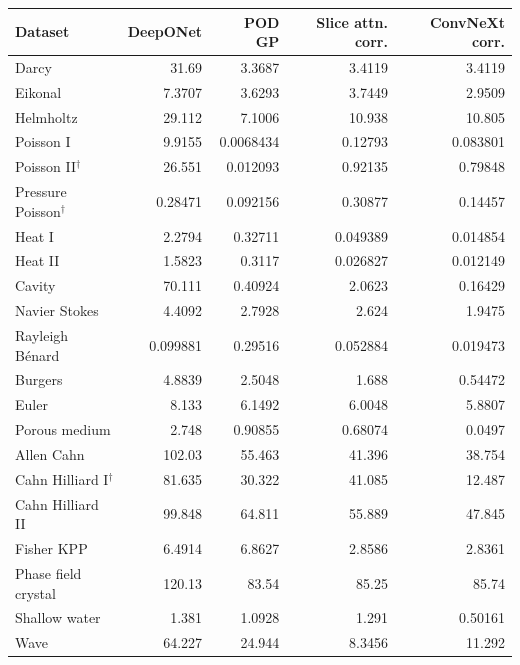 \begin{tabular}{lrrrr}
\toprule
Dataset & DeepONet & POD GP & Slice attn. corr. & ConvNeXt corr. \\
\midrule
Darcy & 31.69 & 3.3687 & 3.4119 & 3.4119 \\
Eikonal & 7.3707 & 3.6293 & 3.7449 & 2.9509 \\
Helmholtz & 29.112 & 7.1006 & 10.938 & 10.805 \\
Poisson I & 9.9155 & 0.0068434 & 0.12793 & 0.083801 \\
Poisson II$^{\dagger}$ & 26.551 & 0.012093 & 0.92135 & 0.79848 \\
Pressure Poisson$^{\dagger}$ & 0.28471 & 0.092156 & 0.30877 & 0.14457 \\
Heat I & 2.2794 & 0.32711 & 0.049389 & 0.014854 \\
Heat II & 1.5823 & 0.3117 & 0.026827 & 0.012149 \\
Cavity & 70.111 & 0.40924 & 2.0623 & 0.16429 \\
Navier Stokes & 4.4092 & 2.7928 & 2.624 & 1.9475 \\
Rayleigh Bénard & 0.099881 & 0.29516 & 0.052884 & 0.019473 \\
Burgers & 4.8839 & 2.5048 & 1.688 & 0.54472 \\
Euler & 8.133 & 6.1492 & 6.0048 & 5.8807 \\
Porous medium & 2.748 & 0.90855 & 0.68074 & 0.0497 \\
Allen Cahn & 102.03 & 55.463 & 41.396 & 38.754 \\
Cahn Hilliard I$^{\dagger}$ & 81.635 & 30.322 & 41.085 & 12.487 \\
Cahn Hilliard II & 99.848 & 64.811 & 55.889 & 47.845 \\
Fisher KPP & 6.4914 & 6.8627 & 2.8586 & 2.8361 \\
Phase field crystal & 120.13 & 83.54 & 85.25 & 85.74 \\
Shallow water & 1.381 & 1.0928 & 1.291 & 0.50161 \\
Wave & 64.227 & 24.944 & 8.3456 & 11.292 \\
\bottomrule
\end{tabular}
